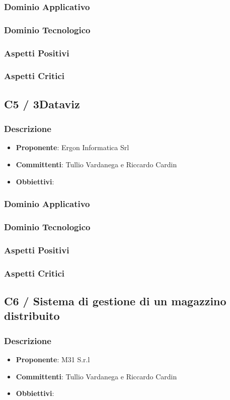 \documentclass[a4paper, 12pt]{article}
\begin{document}
\subsubsection{Dominio Applicativo}
\subsubsection{Dominio Tecnologico}
\subsubsection{Aspetti Positivi}
\subsubsection{Aspetti Critici}
\subsection{C5 / 3Dataviz}
\subsubsection{Descrizione}
\begin{itemize}
    \item \textbf{Proponente}: Ergon Informatica Srl
    \item \textbf{Committenti}: Tullio Vardanega e Riccardo Cardin
    \item \textbf{Obbiettivi}: 
\end{itemize}
\subsubsection{Dominio Applicativo}
\subsubsection{Dominio Tecnologico}
\subsubsection{Aspetti Positivi}
\subsubsection{Aspetti Critici}
\subsection{C6 / Sistema di gestione di un magazzino distribuito}
\subsubsection{Descrizione}
\begin{itemize}
    \item \textbf{Proponente}: M31 S.r.l
    \item \textbf{Committenti}: Tullio Vardanega e Riccardo Cardin
    \item \textbf{Obbiettivi}: 
\end{itemize}
\end{document}
